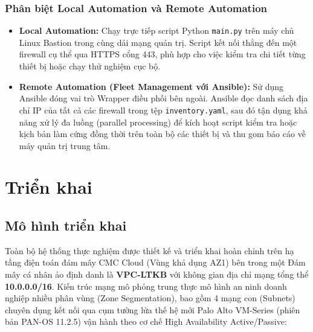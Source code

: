 \documentclass[12pt,a4paper]{article}
\begin{document}
\subsubsection{Phân biệt Local Automation và Remote Automation}
\begin{itemize}
    \item \textbf{Local Automation:} Chạy trực tiếp script Python \texttt{main.py} trên máy chủ Linux Bastion trong cùng dải mạng quản trị. Script kết nối thẳng đến một firewall cụ thể qua HTTPS cổng 443, phù hợp cho việc kiểm tra chi tiết từng thiết bị hoặc chạy thử nghiệm cục bộ.
    \item \textbf{Remote Automation (Fleet Management với Ansible):} Sử dụng Ansible đóng vai trò Wrapper điều phối bên ngoài. Ansible đọc danh sách địa chỉ IP của tất cả các firewall trong tệp \texttt{inventory.yaml}, sau đó tận dụng khả năng xử lý đa luồng (parallel processing) để kích hoạt script kiểm tra hoặc kịch bản làm cứng đồng thời trên toàn bộ các thiết bị và thu gom báo cáo về máy quản trị trung tâm.
\end{itemize}

\section{Triển khai}

\subsection{Mô hình triển khai}

\noindent Toàn bộ hệ thống thực nghiệm được thiết kế và triển khai hoàn chỉnh trên hạ tầng điện toán đám mây CMC Cloud (Vùng khả dụng AZ1) bên trong một Đám mây cá nhân ảo định danh là \textbf{VPC-LTKB} với không gian địa chỉ mạng tổng thể \textbf{10.0.0.0/16}. Kiến trúc mạng mô phỏng trung thực mô hình an ninh doanh nghiệp nhiều phân vùng (Zone Segmentation), bao gồm 4 mạng con (Subnets) chuyên dụng kết nối qua cụm tường lửa thế hệ mới Palo Alto VM-Series (phiên bản PAN-OS 11.2.5) vận hành theo cơ chế High Availability Active/Passive:

\vspace{0.3cm}
\end{document}
